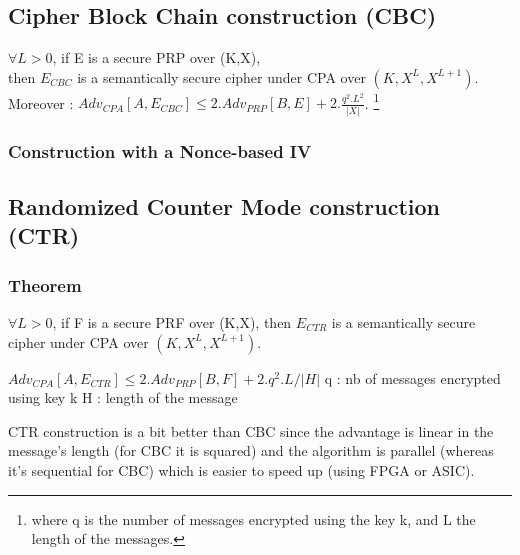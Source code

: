 \subsection{Cipher Block Chain construction (CBC)}



\begin{mytheorem}
   $\forall L>0$, if E is a secure PRP over (K,X), \\
   then $E_{CBC}$ is a semantically secure cipher under CPA over $(K,X^L,X^{L+1})$. \\
 	Moreover : $Adv_{CPA}[A,E_{CBC}] \leq 2.Adv_{PRP}[B,E] + 2.\frac{q^2.L^2}{|X|} $. \footnote{where q is the number of messages encrypted using the key k, and L the length of the messages.}
\end{mytheorem}

\subsubsection{Construction with a Nonce-based IV}

\subsection{Randomized Counter Mode construction (CTR)}


\subsubsection{Theorem}

$\forall L>0$, if F is a secure PRF over (K,X), then $E_{CTR}$ is a semantically secure cipher under CPA over $(K,X^L,X^{L+1})$.

$Adv_{CPA}[A,E_{CTR}] \leq 2.Adv_{PRP}[B,F] + 2.q^2.L/|H| $
q : nb of messages encrypted using key k
H : length of the message

CTR construction is a bit better than CBC since the advantage is linear in the message's length (for CBC it is squared) and the algorithm is parallel (whereas it's sequential for CBC) which is easier to speed up (using FPGA or ASIC).





